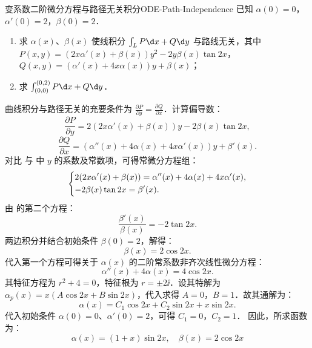 \begin{problem}{变系数二阶微分方程与路径无关积分}{ODE-Path-Independence}
    已知 $\alpha(0) = 0$，$\alpha'(0) = 2$，$\beta(0) = 2$．
    \begin{enumerate}
        \item 求 $\alpha(x)$、$\beta(x)$ 使线积分 $\int_L P \d x + Q \d y$ 与路线无关，其中 $P(x,y) = (2x\alpha'(x) + \beta(x))y^2 - 2y\beta(x) \tan 2x$，$Q(x,y) = (\alpha'(x) + 4x\alpha(x))y + \beta(x)$；
        \item 求 $\int_{(0,0)}^{(0,2)} P \d x + Q \d y$．
    \end{enumerate}
\end{problem}

\begin{solution}

    曲线积分与路径无关的充要条件为 $\frac{\partial P}{\partial y} = \frac{\partial Q}{\partial x}$．计算偏导数：
    \begin{equation}
        \label{eq:deriv-P-y}
        \frac{\partial P}{\partial y} = 2(2x\alpha'(x) + \beta(x))y - 2\beta(x) \tan 2x,
    \end{equation}
    \begin{equation}
        \label{eq:deriv-Q-x}
        \frac{\partial Q}{\partial x} = (\alpha''(x) + 4\alpha(x) + 4x\alpha'(x))y + \beta'(x).
    \end{equation}
    对比  与  中 $y$ 的系数及常数项，可得常微分方程组：
    \begin{equation}
        \label{eq:ode-system}
        \begin{dcases}
            2(2x\alpha'(x) + \beta(x)) = \alpha''(x) + 4\alpha(x) + 4x\alpha'(x), \\
            -2\beta(x) \tan 2x = \beta'(x).
        \end{dcases}
    \end{equation}
    由  的第二个方程：
    \begin{equation}
        \frac{\beta'(x)}{\beta(x)} = -2 \tan 2x.
    \end{equation}
    两边积分并结合初始条件 $\beta(0) = 2$，解得：
    \begin{equation}
        \beta(x) = 2 \cos 2x.
    \end{equation}
    代入第一个方程可得关于 $\alpha(x)$ 的二阶常系数非齐次线性微分方程：
    \begin{equation}
        \alpha''(x) + 4\alpha(x) = 4\cos 2x.
    \end{equation}
    其特征方程为 $r^2 + 4 = 0$，特征根为 $r = \pm 2\ii$．设其特解为 $\alpha_p(x) = x(A\cos 2x + B\sin 2x)$，代入求得 $A=0$，$B=1$．故其通解为：
    \begin{equation}
        \alpha(x) = C_1 \cos 2x + C_2 \sin 2x + x \sin 2x.
    \end{equation}
    代入初始条件 $\alpha(0) = 0$、$\alpha'(0) = 2$，可得 $C_1 = 0$，$C_2 = 1$．
    因此，所求函数为：
    \begin{equation}
        \boxed{\alpha(x) = (1+x)\sin 2x, \quad \beta(x) = 2\cos 2x}
    \end{equation}


\end{solution}
